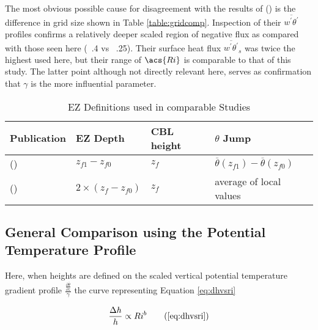 The most obvious possible cause for disagreement with the results of \citeauthor{FedConzMir04} (\citeyear{FedConzMir04}) is the difference in grid size shown in Table \ref{table:gridcomp}.  Inspection of their $\overline{w^{'}\theta^{'}}$ profiles confirms a relatively deeper scaled region of negative flux as compared with those seen here (~.4 vs ~.25). Their surface heat flux $\overline{w^{'}\theta^{'}}_{s}$ was twice the highest used here, but their range of $\acs{Ri}$ is comparable to that of this study.  The latter point although not directly relevant here, serves as confirmation that $\gamma$ is the more influential parameter.\\              

\begin{table}[htbp]
\label{table:elandri}
\caption[\acs{EZ} Definitions used in comparable Studies]{\acs{EZ} Definitions used in comparable Studies}

\begin{center}
\begin{tabular}{ p{4cm} p{2cm} p{1.5cm} p{3cm}}

Publication & \acs{EZ} Depth & \acs{CBL} height & $\theta$ Jump\\ \hline
\citeauthor{FedConzMir04} (\citeyear{FedConzMir04}) & $z_{f1} - z_{f0}$ & $z_{f}$ &  $\overline{\theta}(z_{f1})-\overline{\theta}(z_{f0})$\\ [.3cm] %
\citeauthor{BrooksFowler2} (\citeyear{BrooksFowler2}) & $2 \times (z_{f} - z_{f0})$ & $z_{f}$ & average of local values\\ \hline

\end{tabular}
\end{center}    
\end{table}

\subsection{General Comparison using the Potential Temperature Profile}

Here, when heights are defined on the scaled vertical potential temperature gradient profile $\frac{\frac{\partial \overline{\theta}}{\partial z}}{\gamma}$ the curve representing Equation \ref{eq:dhvsri} 

\begin{equation}
\frac{\Delta h}{h} \propto Ri^{b} \tag{\ref{eq:dhvsri}}
\end{equation}

